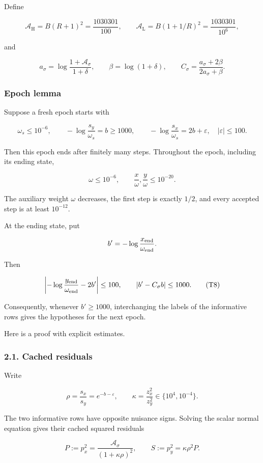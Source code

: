 Define

\[
\mathcal A_{\mathrm H}=B(R+1)^2=\frac{1030301}{100},
\qquad
\mathcal A_{\mathrm L}=B(1+1/R)^2=\frac{1030301}{10^6},
\tag{T4}
\]

and

\[
a_\sigma=\log\frac{1+\mathcal A_\sigma}{1+\delta},
\qquad
\beta=\log(1+\delta),
\qquad
C_\sigma=\frac{a_\sigma+2\beta}{2a_\sigma+\beta}.
\tag{T5}
\]

\subsubsection{Epoch lemma}

Suppose a fresh epoch starts with

\[
\omega_s\le10^{-6},\qquad
-\log\frac{s_y}{\omega_s}=b\ge1000,
\qquad
-\log\frac{s_x}{\omega_s}=2b+\varepsilon,
\quad |\varepsilon|\le100.
\tag{T6}
\]

Then this epoch ends after finitely many steps. Throughout the epoch, including its ending state,

\[
\omega\le10^{-6},
\qquad
\frac{x}{\omega},\frac{y}{\omega}\le10^{-20}.
\tag{T7}
\]

The auxiliary weight \(\omega\) decreases, the first step is exactly \(1/2\), and every accepted step is at least \(10^{-12}\).

At the ending state, put

\[
b'=-\log\frac{x_{\rm end}}{\omega_{\rm end}}.
\]

Then

\[
\left|
-\log\frac{y_{\rm end}}{\omega_{\rm end}}-2b'
\right|\le100,
\qquad
|b'-C_\sigma b|\le1000.
\tag{T8}
\]

Consequently, whenever \(b'\ge1000\), interchanging the labels of the informative rows gives the hypotheses for the next epoch.

Here is a proof with explicit estimates.

\subsubsection{2.1. Cached residuals}

Write

\[
\rho=\frac{s_x}{s_y}=e^{-b-\varepsilon},
\qquad
\kappa=\frac{z_x^2}{z_y^2}\in\{10^4,10^{-4}\}.
\]

The two informative rows have opposite nuisance signs. Solving the scalar normal equation gives their cached squared residuals

\[
P:=p_x^2=\frac{\mathcal A_\sigma}{(1+\kappa\rho)^2},
\qquad
S:=p_y^2=\kappa\rho^2P.
\tag{T9}
\]

